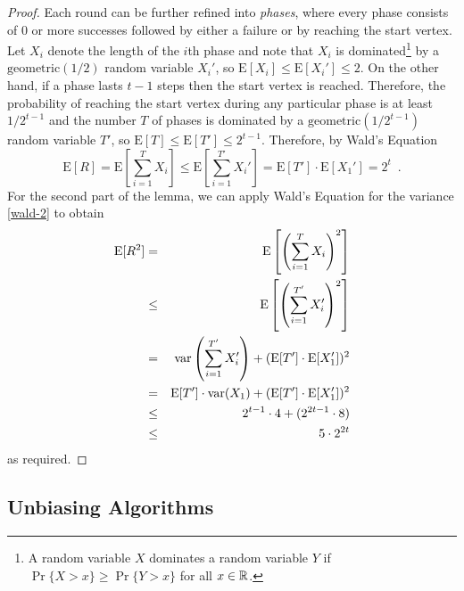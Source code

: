 \documentclass[lotsofwhite]{patmorin}
\newcommand{\E}{\mathrm{E}}
\DeclareMathOperator{\var}{var}
\begin{document}
\begin{proof}
Each round can be further refined into \emph{phases}, where every
phase consists of 0 or more successes followed by either a failure or
by reaching the start vertex.  Let $X_i$ denote the length of the
$i$th phase and note that $X_i$ is dominated\footnote{A random
variable $X$ dominates a random variable $Y$ if $\Pr\{X > x\}\ge
\Pr\{Y > x\}$ for all $x\in\mathbb{R}$.} by a $\mathrm{geometric}(1/2)$ random
variable $X_i'$, so $\E[X_i]\le\E[X_i']\le 2$.  On the other hand, if a phase lasts
$t-1$ steps then the start vertex is reached.  Therefore, the
probability of reaching the start vertex during any particular phase
is at least $1/2^{t-1}$ and the number $T$ of phases is dominated by a
$\mathrm{geometric}(1/2^{t-1})$ random variable $T'$, so
$\E[T]\le\E[T']\le 2^{t-1}$.
Therefore, by Wald's Equation
\[
  \E[R] = \E\left[\sum_{i=1}^T X_i\right]\le \E\left[\sum_{i=1}^{T'}
X_i'\right] = \E[T']\cdot\E[X_1'] = 2^t \enspace .
\]
For the second part of the lemma, we can apply Wald's Equation for
the variance \eqref{wald-2} to
obtain
\begin{eqnarray*}
  \E[R^2] & = & \E\left[\left(\sum_{i=1}^T X_i\right)^2\right] \\
          &\le& \E\left[\left(\sum_{i=1}^{T'} X_i'\right)^2\right] \\
          & = & \var\left(\sum_{i=1}^{T'} X_i'\right) + (\E[T']\cdot\E[X_1'])^2 \\
          & = & \E[T']\cdot\var(X_1) + (\E[T']\cdot\E[X_1'])^2 \\
          & \le & 2^{t-1}\cdot 4 + (2^{2t-1}\cdot 8) \\
          & \le & 5\cdot2^{2t}
\comment{
          & = & \E\left[\sum_{i=1}^{T'} (X_i')^2
                + \sum_{i=1}^{T'}\sum_{j=i+1}^{T'} 2X_i'X_j' \right] \\
          & = & \E\left[\sum_{i=1}^{T'} (X_i')^2\right]
                + \E\left[\sum_{i=1}^{T'}\sum_{j=i+1}^{T'} 2X_i'X_j'\right] \\
          & = & \E[T']\cdot \E\left[(X_i')^2\right]
                + \E\left[\sum_{i=1}^T\sum_{j=i+1}^{T'} 2X_i'X_j'\right] \\
          & = & \E[T']\cdot \E\left[(X_i')^2\right]
                + \E\left[\sum_{i=1}^T\sum_{j=i+1}^{T'} 2X_i'X_j'\right] \\

}
\end{eqnarray*}
as required.
\end{proof}


\subsection{Unbiasing Algorithms}
\end{document}

